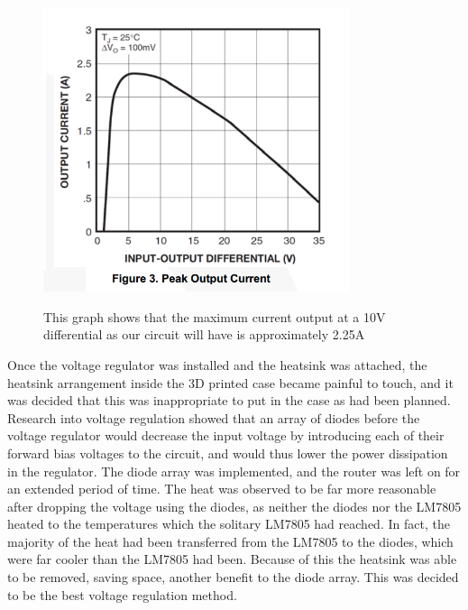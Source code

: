 \begin{figure}[ht]
  \caption{This graph shows that the maximum current output at a 10V differential as our circuit will have is approximately 2.25A}
  \centering
    \includegraphics[width=0.8\textwidth]{Images/Telemetry/TEL_lm7805current.png}
    \label{TEL_lm7805current}
\end{figure}

Once the voltage regulator was installed and the heatsink was attached, the heatsink arrangement inside the 3D printed case became painful to touch, and it was decided that this was inappropriate to put in the case as had been planned. Research into voltage regulation showed that an array of diodes before the voltage regulator would decrease the input voltage by introducing each of their forward bias voltages to the circuit, and would thus lower the power dissipation in the regulator. The diode array was implemented, and the router was left on for an extended period of time. The heat was observed to be far more reasonable after dropping the voltage using the diodes, as neither the diodes nor the LM7805 heated to the temperatures which the solitary LM7805 had reached. In fact, the majority of the heat had been transferred from the LM7805 to the diodes, which were far cooler than the LM7805 had been. Because of this the heatsink was able to be removed, saving space, another benefit to the diode array. This was decided to be the best voltage regulation method.

